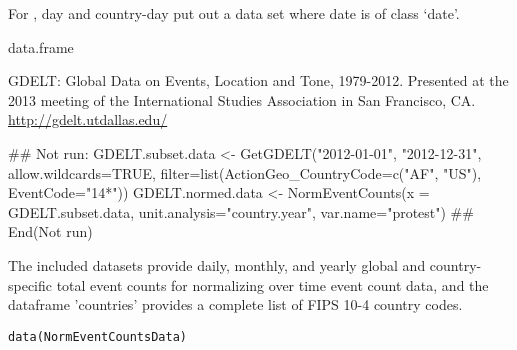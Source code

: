 \documentclass[a4paper]{book}
\begin{document}
%
\begin{Details}\relax
For , day and country-day put out a
data set where date is of class `date'.
\end{Details}
%
\begin{Value}
data.frame
\end{Value}
%
\begin{Author}\relax

\end{Author}
%
\begin{References}\relax
GDELT: Global Data on Events, Location and Tone,
1979-2012. Presented at the 2013 meeting of the
International Studies Association in San Francisco, CA.
\url{http://gdelt.utdallas.edu/}
\end{References}
%
\begin{Examples}
\begin{ExampleCode}
## Not run: 
GDELT.subset.data <- GetGDELT("2012-01-01", "2012-12-31", allow.wildcards=TRUE,
                              filter=list(ActionGeo_CountryCode=c("AF", "US"), EventCode="14*"))
GDELT.normed.data <- NormEventCounts(x = GDELT.subset.data,
                                     unit.analysis="country.year",
                                     var.name="protest")
## End(Not run)
\end{ExampleCode}
\end{Examples}
%
\begin{Description}\relax
The included datasets provide daily, monthly, and yearly global and country-specific total event counts for normalizing over time event count data, and the dataframe 'countries' provides a complete list of FIPS 10-4 country codes.
\end{Description}
%
\begin{Usage}
\begin{verbatim}
data(NormEventCountsData)
\end{verbatim}
\end{Usage}
%
\end{document}
